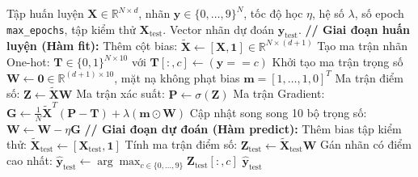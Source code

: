 \documentclass[11pt,a4paper]{article}
\begin{document}
\begin{algorithm}[H]
\caption{Huấn luyện và Dự đoán One-vs-Rest Logistic Regression}
\label{alg:logistic_ovr}
\begin{algorithmic}[1]
\Require Tập huấn luyện $\mathbf{X} \in \mathbb{R}^{N \times d}$, nhãn $\mathbf{y} \in \{0, \dots, 9\}^N$, tốc độ học $\eta$, hệ số $\lambda$, số epoch \texttt{max\_epochs}, tập kiểm thử $\mathbf{X}_{\text{test}}$.
\Ensure Vector nhãn dự đoán $\hat{\mathbf{y}}_{\text{test}}$.
\Statex \textbf{// Giai đoạn huấn luyện (Hàm fit):}
\State Thêm cột bias: $\tilde{\mathbf{X}} \leftarrow [\mathbf{X}, \mathbf{1}] \in \mathbb{R}^{N \times (d+1)}$
\State Tạo ma trận nhãn One-hot: $\mathbf{T} \in \{0, 1\}^{N \times 10}$ với $\mathbf{T}[:, c] \leftarrow (\mathbf{y} == c)$
\State Khởi tạo ma trận trọng số $\mathbf{W} \leftarrow \mathbf{0} \in \mathbb{R}^{(d+1) \times 10}$, mặt nạ không phạt bias $\mathbf{m} = [1, \dots, 1, 0]^T$
    \State Ma trận điểm số: $\mathbf{Z} \leftarrow \tilde{\mathbf{X}}\mathbf{W}$
    \State Ma trận xác suất: $\mathbf{P} \leftarrow \sigma(\mathbf{Z})$
    \State Ma trận Gradient: $\mathbf{G} \leftarrow \frac{1}{N}\tilde{\mathbf{X}}^T(\mathbf{P} - \mathbf{T}) + \lambda(\mathbf{m} \odot \mathbf{W})$
    \State Cập nhật song song 10 bộ trọng số: $\mathbf{W} \leftarrow \mathbf{W} - \eta \mathbf{G}$
\EndFor
\Statex \textbf{// Giai đoạn dự đoán (Hàm predict):}
\State Thêm bias tập kiểm thử: $\tilde{\mathbf{X}}_{\text{test}} \leftarrow [\mathbf{X}_{\text{test}}, \mathbf{1}]$
\State Tính ma trận điểm số: $\mathbf{Z}_{\text{test}} \leftarrow \tilde{\mathbf{X}}_{\text{test}}\mathbf{W}$
\State Gán nhãn có điểm cao nhất: $\hat{\mathbf{y}}_{\text{test}} \leftarrow \arg\max_{c \in \{0, \dots, 9\}} \mathbf{Z}_{\text{test}}[:, c]$
\State \Return $\hat{\mathbf{y}}_{\text{test}}$
\end{algorithmic}
\end{algorithm}
\end{document}
